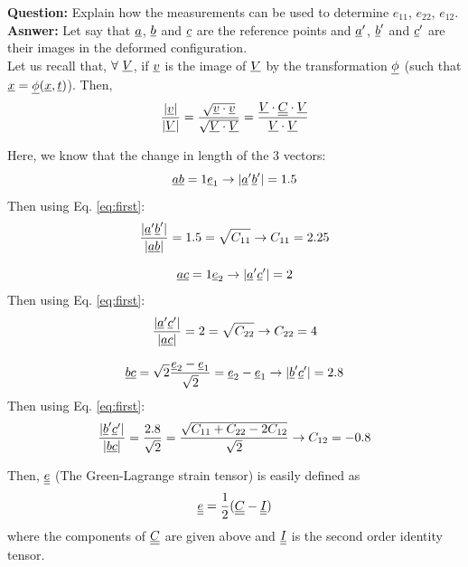 \documentclass[letter,12pt]{article}
\begin{document}
	\noindent \textbf{Question:} Explain how the measurements can be used to determine $e_{11}$, $e_{22}$, $e_{12}$. \\

 \noindent \textbf{Asnwer:} Let say that $\underline{a}$, $\underline{b}$ and $\underline{c}$ are the reference points and $\underline{a}'$, $\underline{b}'$ and $\underline{c}'$ are their images in the deformed configuration. \\
 
 Let us recall that, $\forall \text{ }\underline{V}$, if $\underline{v}$ is the image of $\underline{V}$ by the transformation $\underline{\phi}$ (such that $\underline{x} = \underline{\phi} (\underline{x}, \underline{t})$). Then,
 \begin{equation}
 \frac{|\underline{v}|}{|\underline{V}|} = \frac{\sqrt{\underline{v} \cdot \underline{v}}}{\sqrt{\underline{V} \cdot \underline{V}}} = \frac{\underline{V} \cdot \underline{\underline{C}} \cdot \underline{V}}{\underline{V} \cdot \underline{V}}
 \label{eq:first}
 \end{equation}
 
 Here, we know that the change in length of the 3 vectors:
 \begin{equation}
 \underline{a} \underline{b} = 1 \underline{e}_1  \rightarrow |\underline{a}'\underline{b}'| = 1.5
 \end{equation}
 Then using Eq. \ref{eq:first}: 
 \begin{equation}
 \frac{|\underline{a}'\underline{b}'|}{|\underline{a} \underline{b}|} = 1.5 = \sqrt{C_{11}} \rightarrow C_{11} = 2.25
 \end{equation}
 
  \begin{equation}
 \underline{a} \underline{c} = 1 \underline{e}_2  \rightarrow |\underline{a}'\underline{c}'| = 2
 \end{equation}
 Then using Eq. \ref{eq:first}: 
 \begin{equation}
 \frac{|\underline{a}'\underline{c}'|}{|\underline{a} \underline{c}|} = 2 = \sqrt{C_{22}} \rightarrow C_{22} = 4
 \end{equation}
 
  \begin{equation}
 \underline{b} \underline{c} = \sqrt{2} \frac{\underline{e}_2 - \underline{e}_1}{\sqrt{2}} = \underline{e}_2 - \underline{e}_1  \rightarrow |\underline{b}'\underline{c}'| = 2.8
 \end{equation}
 Then using Eq. \ref{eq:first}: 
 \begin{equation}
 \frac{|\underline{b}'\underline{c}'|}{|\underline{b} \underline{c}|} = \frac{2.8}{\sqrt{2}} = \frac{\sqrt{C_{11} + C_{22} - 2C_{12}}}{\sqrt{2}} \rightarrow C_{12} = -0.8
 \end{equation}

Then, $\underline{\underline{e}}$ (The Green-Lagrange strain tensor) is easily defined as
\begin{equation}
\underline{\underline{e}} = \frac{1}{2} (\underline{\underline{C}} - \underline{\underline{I}})
\end{equation}
where the components of $\underline{\underline{C}}$ are given above and $\underline{\underline{I}}$ is the second order identity tensor.

 
 
 


 
\end{document}
